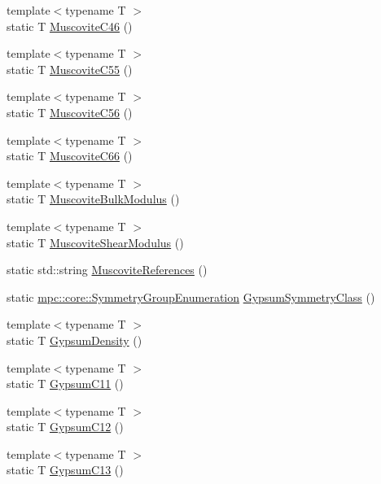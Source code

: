 \begin{DoxyCompactItemize}
{\footnotesize template$<$typename T $>$ }\\static T \mbox{\hyperlink{namespacempc_1_1data_af48c09001fb1cdb99362aa0b8e0f1aa8}{Muscovite\+C46}} ()
\item 
{\footnotesize template$<$typename T $>$ }\\static T \mbox{\hyperlink{namespacempc_1_1data_ab21878b361670029239ebd76345a66b9}{Muscovite\+C55}} ()
\item 
{\footnotesize template$<$typename T $>$ }\\static T \mbox{\hyperlink{namespacempc_1_1data_a4b40024537e41e9799cd99f218eac085}{Muscovite\+C56}} ()
\item 
{\footnotesize template$<$typename T $>$ }\\static T \mbox{\hyperlink{namespacempc_1_1data_a9e11d4170f85a523af28ca2f1b5feed7}{Muscovite\+C66}} ()
\item 
{\footnotesize template$<$typename T $>$ }\\static T \mbox{\hyperlink{namespacempc_1_1data_a769f00b3db436fe21da547e0c0e89eae}{Muscovite\+Bulk\+Modulus}} ()
\item 
{\footnotesize template$<$typename T $>$ }\\static T \mbox{\hyperlink{namespacempc_1_1data_ac3f1ad8a1c5464007e1ec622e72a0fcc}{Muscovite\+Shear\+Modulus}} ()
\item 
static std\+::string \mbox{\hyperlink{namespacempc_1_1data_aad2c429b249c35ccb88fc81927987f81}{Muscovite\+References}} ()
\item 
static \mbox{\hyperlink{namespacempc_1_1core_a9d979684062547055a0ef5c13077bad8}{mpc\+::core\+::\+Symmetry\+Group\+Enumeration}} \mbox{\hyperlink{namespacempc_1_1data_ad80d950559624802898e23e000ce43c1}{Gypsum\+Symmetry\+Class}} ()
\item 
{\footnotesize template$<$typename T $>$ }\\static T \mbox{\hyperlink{namespacempc_1_1data_afaf12e86464e4999665aa920c8fe2ed2}{Gypsum\+Density}} ()
\item 
{\footnotesize template$<$typename T $>$ }\\static T \mbox{\hyperlink{namespacempc_1_1data_a77f3d1f6a18679d3a1661409c80b3199}{Gypsum\+C11}} ()
\item 
{\footnotesize template$<$typename T $>$ }\\static T \mbox{\hyperlink{namespacempc_1_1data_a6e87524023885d590744ed69c50879db}{Gypsum\+C12}} ()
\item 
{\footnotesize template$<$typename T $>$ }\\static T \mbox{\hyperlink{namespacempc_1_1data_a4e61deb51d3208e0781f9e3b832e3192}{Gypsum\+C13}} ()

\end{DoxyCompactItemize}

